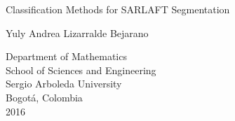 \begin{titlepage}

  \begin{center}

    {\LARGE Classification Methods for SARLAFT Segmentation}

    \vspace*{\fill}

    {\large Yuly Andrea Lizarralde Bejarano}

    \vspace*{\fill}

    {\large Department of Mathematics}\\
    {\large School of Sciences and Engineering }\\
    {\large Sergio Arboleda University }\\
    {\large Bogot\'a, Colombia}\\
    {\large 2016}


  \end{center}

\end{titlepage}
